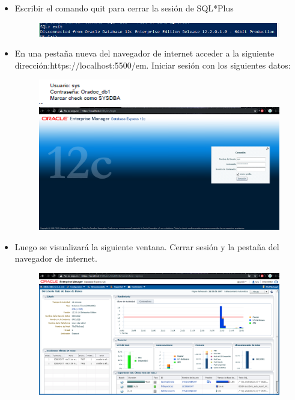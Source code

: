 \begin{itemize}
\begin{figure}[H]
		\end{figure}
	\item Escribir el comando quit para cerrar la sesión de SQL*Plus
		\begin{figure}[H]
		\begin{center}
		\includegraphics[width=15cm]{./Imagenes/10}
		\end{center}
		\end{figure}
	\item En una pestaña nueva del navegador de internet acceder a la siguiente dirección:https://localhost:5500/em. Iniciar sesión con los siguientes datos:
		\begin{figure}[H]
		\begin{center}
		\includegraphics[width=4cm]{./Imagenes/t1}
		\includegraphics[width=15cm]{./Imagenes/11}
		\end{center}
		\end{figure}
	\item Luego se visualizará la siguiente ventana. Cerrar sesión y la pestaña del navegador de internet.
		\begin{figure}[H]
		\begin{center}
		\includegraphics[width=15cm]{./Imagenes/12}

\end{center}
\end{figure}
\end{itemize}
